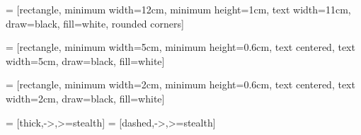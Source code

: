 \usepackage{tikz}
\usetikzlibrary{calc}
\usetikzlibrary{shapes.geometric, arrows, fit}
\usetikzlibrary{arrows.meta, positioning}

 = [rectangle, 
minimum width=12cm, 
minimum height=1cm, 
text width=11cm, 
draw=black, 
fill=white,
rounded corners]

 = [rectangle, 
minimum width=5cm, 
minimum height=0.6cm, 
text centered, 
text width=5cm, 
draw=black, 
fill=white]

 = [rectangle, 
minimum width=2cm, 
minimum height=0.6cm, 
text centered, 
text width=2cm, 
draw=black, 
fill=white]

 = [thick,->,>=stealth]
 = [dashed,->,>=stealth]